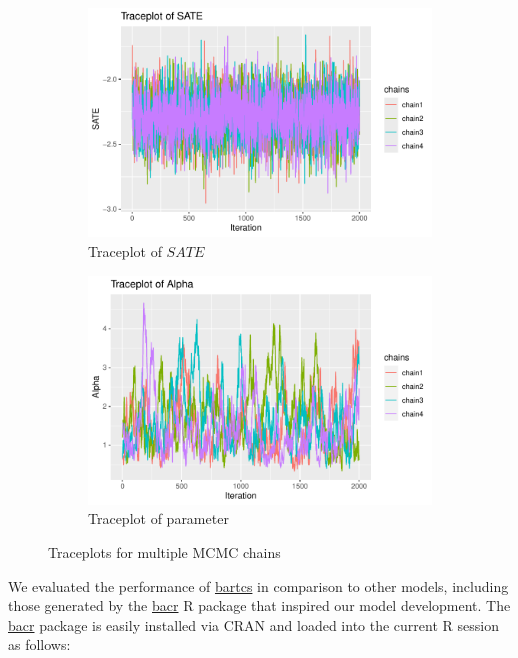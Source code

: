 \begin{figure}[htbp]
\begin{subfigure}{0.5\textwidth}
\includegraphics[width=\linewidth]{fig/traceplot_ATE.pdf}
\caption{Traceplot of $SATE$}
\end{subfigure}%
\begin{subfigure}{0.5\textwidth}
\includegraphics[width=\linewidth]{fig/traceplot_alpha.pdf}
\caption{Traceplot of  parameter}
\end{subfigure}
\caption{Traceplots for multiple MCMC chains} \label{fig:traceplot}
\end{figure}
We evaluated the performance of \href{https://CRAN.R-project.org/package=bartcs}{bartcs} in comparison to other models, including those generated by the \href{https://CRAN.R-project.org/package=bacr}{bacr} R package \citep{wang2015accounting}  that inspired our model development. The \href{https://CRAN.R-project.org/package=bacr}{bacr} package is easily installed via CRAN and loaded into the current R session as follows:
